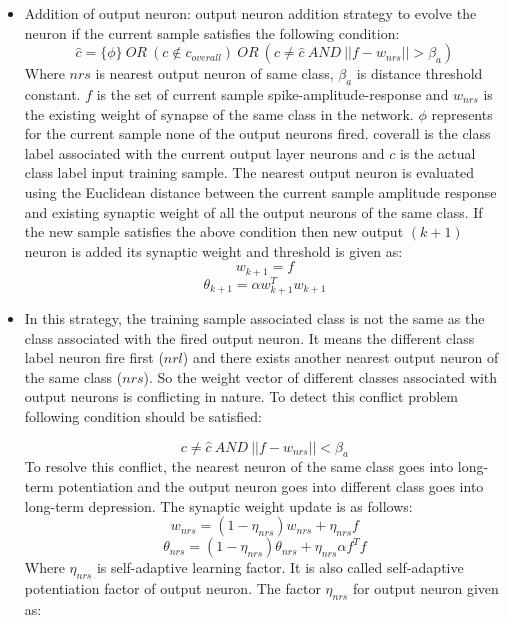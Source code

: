 \begin{itemize}
	\item Addition of output neuron: output neuron addition strategy to evolve the neuron if the current sample satisfies the following condition: 
	\begin{equation}
		\hat{c}= \{\phi\}\ OR\ (c \notin c_{overall})\ OR\ (c \neq \hat{c}\ AND\ ||f-w_{nrs}||>\beta_a)
	\end{equation}
	Where $nrs$ is nearest output neuron of same class, $\beta_a$ is distance threshold constant. $f$ is the set of current sample spike-amplitude-response and $w_{nrs}$ is the existing weight of synapse of the same class in the network. $\phi$ represents for the current sample none of the output neurons fired. coverall is the class label associated with the current output layer neurons and $c$ is the actual class label input training sample. The nearest output neuron is evaluated using the Euclidean distance between the current sample amplitude response and existing synaptic weight of all the output neurons of the same class. If the new sample satisfies the above condition then new output $(k+1)$ neuron is added its synaptic weight and threshold is given as:
	\begin{equation}
		w_{k+1}=f
	\end{equation}
	\begin{equation}
		\theta_{k+1}=\alpha w^T_{k+1} w_{k+1}
	\end{equation}
	
	\item In this strategy, the training sample associated class is not the same as the class associated with the fired output neuron. It means the different class label neuron fire first ($nrl$) and there exists another nearest output neuron of the same class ($nrs$). So the weight vector of different classes associated with output neurons is conflicting in nature. To detect this conflict problem following condition should be satisfied:

	\begin{equation}
		c\neq \hat{c}\ AND\ ||f-w_{nrs}||<\beta_a
	\end{equation}
	To resolve this conflict, the nearest neuron of the same class goes into long-term potentiation and the output neuron goes into different class goes into long-term depression. The synaptic weight update is as follows:
	\begin{equation}
		w_{nrs}=(1-\eta_{nrs})w_{nrs}+\eta_{nrs}f
	\end{equation}
	\begin{equation}
		\theta_{nrs}=(1-\eta_{nrs})\theta_{nrs}+\eta_{nrs}\alpha f^T f
	\end{equation}
	Where $\eta_{nrs}$ is self-adaptive learning factor. It is also called self-adaptive potentiation factor of output neuron. The factor $\eta_{nrs}$ for output neuron given as:
	

\end{itemize}
